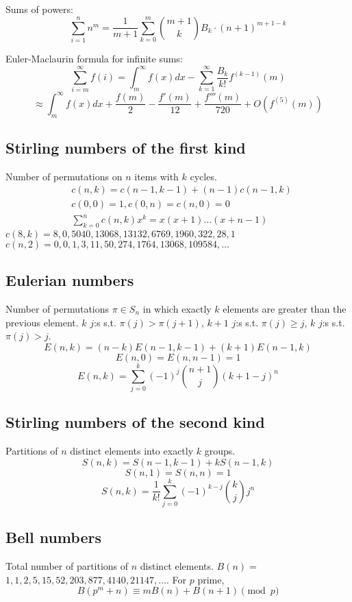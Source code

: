 		Sums of powers:
		\small
		\[ \sum_{i=1}^n n^m = \frac{1}{m+1} \sum_{k=0}^m \binom{m+1}{k} B_k \cdot (n+1)^{m+1-k} \]
		\normalsize

		Euler-Maclaurin formula for infinite sums:
		\small
		\[ \sum_{i=m}^{\infty} f(i) = \int_m^\infty f(x) dx - \sum_{k=1}^\infty \frac{B_k}{k!}f^{(k-1)}(m) \]
		\[ \approx \int_{m}^\infty f(x)dx + \frac{f(m)}{2} - \frac{f'(m)}{12} + \frac{f'''(m)}{720} + O(f^{(5)}(m)) \]
		\normalsize

	\subsection{Stirling numbers of the first kind}
		Number of permutations on $n$ items with $k$ cycles.
		\begin{align*}
			&c(n,k) = c(n-1,k-1) + (n-1) c(n-1,k)\\ 
			&c(0,0) = 1,c(0,n)=c(n,0)=0 \\
			&\textstyle \sum_{k=0}^n c(n,k)x^k = x(x+1) \dots (x+n-1)
		\end{align*}
		$c(8,k) = 8, 0, 5040, 13068, 13132, 6769, 1960, 322, 28, 1$ \\
		$c(n,2) = 0, 0, 1, 3, 11, 50, 274, 1764, 13068, 109584, \dots$

	\subsection{Eulerian numbers}
		Number of permutations $\pi \in S_n$ in which exactly $k$ elements are greater than the previous element. $k$ $j$:s s.t. $\pi(j)>\pi(j+1)$, $k+1$ $j$:s s.t. $\pi(j)\geq j$, $k$ $j$:s s.t. $\pi(j)>j$.
		$$E(n,k) = (n-k)E(n-1,k-1) + (k+1)E(n-1,k)$$
		$$E(n,0) = E(n,n-1) = 1$$
		$$E(n,k) = \sum_{j=0}^k(-1)^j\binom{n+1}{j}(k+1-j)^n$$

	\subsection{Stirling numbers of the second kind}
		Partitions of $n$ distinct elements into exactly $k$ groups.
		$$S(n,k) = S(n-1,k-1) + k S(n-1,k)$$
		$$S(n,1) = S(n,n) = 1$$
		$$S(n,k) = \frac{1}{k!}\sum_{j=0}^k (-1)^{k-j}\binom{k}{j}j^n$$

	\subsection{Bell numbers}
		Total number of partitions of $n$ distinct elements. $B(n) =$
		$1, 1, 2, 5, 15, 52, 203, 877, 4140, 21147, \dots$. For $p$ prime,
		\[ B(p^m+n)\equiv mB(n)+B(n+1) \pmod{p} \]

